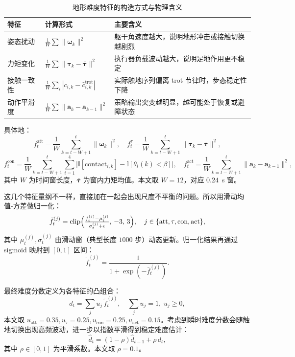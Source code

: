 \documentclass[12pt,a4paper]{ctexart}
\numberwithin{equation}{section}
\numberwithin{table}{section}
\numberwithin{figure}{section}
\newcommand{\subtopic}[1]{\par\addvspace{0.2\baselineskip}\ignorespaces}
\begin{document}
\begin{table}[H]
\centering
\caption{地形难度特征的构造方式与物理含义}
\label{tab:difficulty_features}
\small
\begin{tabular}{p{}p{}p{}}
\toprule
特征 & 计算形式 & 主要含义 \\
\midrule
姿态扰动 & $\frac{1}{W}\sum\|\bm{\omega}_k\|^2$ & 躯干角速度越大，说明地形冲击或接触切换越剧烈 \\
力矩变化 & $\frac{1}{W}\sum\|\bm{\tau}_k-\bar{\bm{\tau}}\|^2$ & 执行器负载波动越大，说明足地作用更不稳定 \\
接触一致性 & $\frac{1}{W}\sum_i|c_{i,k}-\hat c_{i,k}^{\text{trot}}|$ & 实际触地序列偏离 trot 节律时，步态稳定性下降 \\
动作平滑度 & $\frac{1}{W}\sum\|\bm{a}_k-\bm{a}_{k-1}\|^2$ & 策略输出突变越明显，越可能处于恢复或避障状态 \\
\bottomrule
\end{tabular}
\end{table}
具体地：
\begin{equation}
f_t^{\text{att}}=\frac{1}{W}\sum_{k=t-W+1}^{t}\|\bm{\omega}_k\|^2,\quad
f_t^{\tau}=\frac{1}{W}\sum_{k=t-W+1}^{t}\|\bm{\tau}_k-\bar{\bm{\tau}}\|^2,
\end{equation}
\begin{equation}
f_t^{\text{con}}=\frac{1}{W}\sum_{k=t-W+1}^{t}\sum_{i=1}^{4}\bigl|\mathbb{I}[\text{contact}_{i,k}]-\mathbb{I}[\theta_i(k)<\beta]\bigr|,\quad
f_t^{\text{act}}=\frac{1}{W}\sum_{k=t-W+1}^{t}\|\bm{a}_k-\bm{a}_{k-1}\|^2,
\end{equation}
其中 $W$ 为时间窗长度，$\bar{\bm{\tau}}$ 为窗内力矩均值。本文取 $W=12$，对应 $0.24$~s 窗。

\subtopic{特征归一化}
这几个特征量纲不一样，直接加在一起会出现尺度不平衡的问题。所以用滑动均值-方差做归一化：
\begin{equation}
\bar{f}_t^{(j)}=\mathrm{clip}\Bigl(\tfrac{f_t^{(j)}-\mu_t^{(j)}}{\sigma_t^{(j)}+\epsilon},\,-3,\,3\Bigr),\quad j\in\{\text{att},\tau,\text{con},\text{act}\},
\end{equation}
其中 $\mu_t^{(j)},\sigma_t^{(j)}$ 由滑动窗（典型长度 $1000$ 步）动态更新。归一化结果再通过 sigmoid 映射到 $[0,1]$ 区间：
\begin{equation}
\tilde{f}_t^{(j)}=\frac{1}{1+\exp(-\bar{f}_t^{(j)})}.
\end{equation}

\subtopic{难度分数合成与平滑}
最终难度分数定义为各特征的凸组合：
\begin{equation}
d_t=\sum_{j} u_j\,\tilde{f}_t^{(j)},\quad \sum_j u_j=1,\;u_j\ge 0,
\label{eq:dscore}
\end{equation}
本文取 $u_{\text{att}}=0.35,u_\tau=0.25,u_{\text{con}}=0.25,u_{\text{act}}=0.15$。考虑到瞬时难度分数会随触地切换出现高频波动，进一步以指数平滑得到稳定难度估计：
\begin{equation}
\hat{d}_t=(1-\rho)\hat{d}_{t-1}+\rho\,d_t,
\end{equation}
其中 $\rho\in[0,1]$ 为平滑系数。本文取 $\rho=0.1$。
\end{document}
